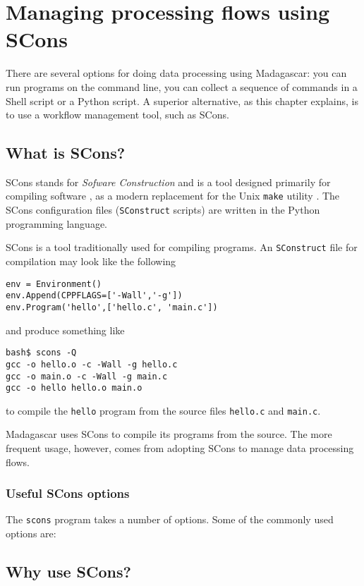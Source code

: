 \chapter{Managing processing flows using SCons}

There are several options for doing data processing using Madagascar:
you can run programs on the command line, you can collect a sequence
of commands in a Shell script or a Python script. A superior
alternative, as this chapter explains, is to use a workflow management
tool, such as SCons.

\section{What is SCons?}

SCons stands for \emph{Sofware Construction} and is a tool designed
primarily for compiling software \cite[]{scons}, as a modern
replacement for the Unix \texttt{make} utility \cite[]{make}. The
SCons configuration files (\texttt{SConstruct} scripts) are written in
the Python programming language.

SCons is a tool traditionally used for compiling programs. An \texttt{SConstruct} file for compilation may look like the following
\lstset{language=python,numbers=left,numberstyle=\tiny,showstringspaces=false}
\begin{lstlisting}
env = Environment()
env.Append(CPPFLAGS=['-Wall','-g'])
env.Program('hello',['hello.c', 'main.c'])
\end{lstlisting}
and produce something like
\begin{verbatim}
bash$ scons -Q
gcc -o hello.o -c -Wall -g hello.c
gcc -o main.o -c -Wall -g main.c
gcc -o hello hello.o main.o
\end{verbatim}
to compile the \texttt{hello} program from the source files \texttt{hello.c} and \texttt{main.c}.

Madagascar uses SCons to compile its programs from the source. The
more frequent usage, however, comes from adopting SCons to manage data
processing flows.

\subsection{Useful SCons options}

The \texttt{scons} program takes a number of options. Some of the commonly used options are:

\section{Why use SCons?}

